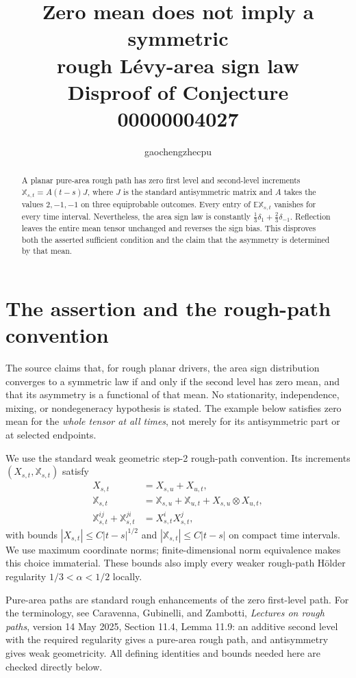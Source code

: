 \documentclass[11pt]{article}
\title{Zero mean does not imply a symmetric\\rough L\'evy-area sign law\\
\large Disproof of Conjecture 00000004027}
\author{gaochengzhecpu}
\date{}
\newcommand{\E}{\mathbb E}
\begin{document}
\maketitle
\begin{abstract}
A planar pure-area rough path has zero first level and second-level increments
$\mathbb X_{s,t}=A(t-s)J$, where $J$ is the standard antisymmetric matrix and
$A$ takes the values $2,-1,-1$ on three equiprobable outcomes.
Every entry of $\E\mathbb X_{s,t}$ vanishes for every time interval.
Nevertheless, the area sign law is constantly
$\frac13\delta_1+\frac23\delta_{-1}$.
Reflection leaves the entire mean tensor unchanged and reverses the sign bias.
This disproves both the asserted sufficient condition and the claim that the
asymmetry is determined by that mean.
\end{abstract}

\section*{The assertion and the rough-path convention}
The source claims that, for rough planar drivers, the area sign distribution
converges to a symmetric law if and only if the second level has zero mean,
and that its asymmetry is a functional of that mean. No stationarity,
independence, mixing, or nondegeneracy hypothesis is stated. The example
below satisfies zero mean for the \emph{whole tensor at all times}, not merely
for its antisymmetric part or at selected endpoints.

We use the standard weak geometric step-2 rough-path convention.
Its increments $(X_{s,t},\mathbb X_{s,t})$ satisfy
\begin{align*}
X_{s,t}&=X_{s,u}+X_{u,t},\\
\mathbb X_{s,t}&=\mathbb X_{s,u}+\mathbb X_{u,t}
                  +X_{s,u}\otimes X_{u,t},\\
\mathbb X_{s,t}^{ij}+\mathbb X_{s,t}^{ji}&=X_{s,t}^iX_{s,t}^j,
\end{align*}
with bounds $|X_{s,t}|\leq C|t-s|^{1/2}$ and
$|\mathbb X_{s,t}|\leq C|t-s|$ on compact time intervals.
We use maximum coordinate norms; finite-dimensional norm equivalence makes
this choice immaterial. These bounds also imply every weaker rough-path
H\"older regularity $1/3<\alpha<1/2$ locally.

Pure-area paths are standard rough enhancements of the zero first-level
path. For the terminology, see Caravenna, Gubinelli, and Zambotti,
\emph{Lectures on rough paths}, version 14 May 2025,
Section 11.4, Lemma 11.9: an additive second level with the required regularity
gives a pure-area rough path, and antisymmetry gives weak geometricity.
All defining identities and bounds needed here are checked directly below.
\end{document}
